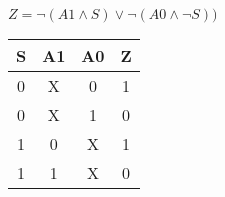 
\begin{center}
    {\(Z = \lnot (A1 \land S) \lor \lnot(A0 \land \lnot S)) \)}
    \begin{table}[h]
        \begin{center}
            \begin{tabular}{|c|c|c||c|} \hline
            S & A1 & A0 & Z \\ \hline\hline
            0 & X  & 0  & 1 \\ \hline
            0 & X  & 1  & 0 \\ \hline
            1 & 0  & X  & 1 \\ \hline
            1 & 1  & X  & 0 \\ \hline
            \end{tabular}
        \end{center}
    \end{table}
\end{center}
